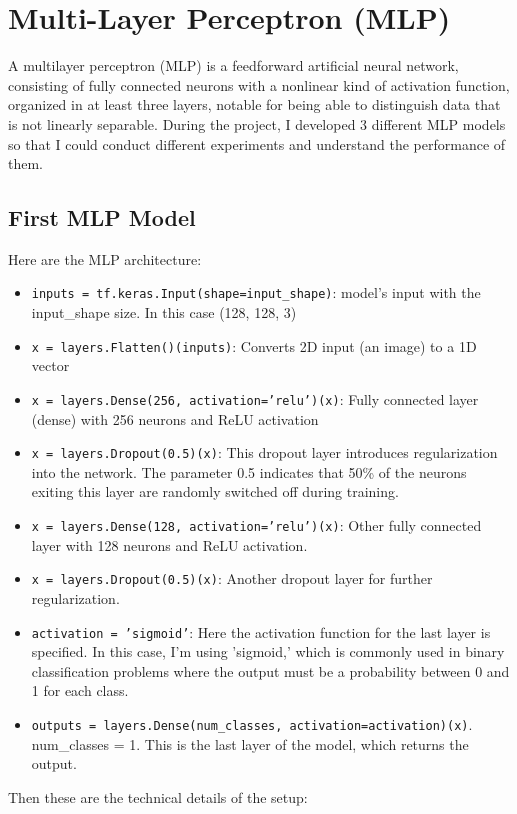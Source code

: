\section{Multi-Layer Perceptron (MLP)}
A multilayer perceptron (MLP) is a feedforward artificial neural network, consisting of fully connected neurons with a nonlinear kind of activation function, organized in at least three layers, notable for being able to distinguish data that is not linearly separable. \cite{mlp}
During the project, I developed 3 different MLP models so that I could conduct different experiments and understand the performance of them.
\subsection{First MLP Model}
Here are the MLP architecture:
\begin{itemize}
\item \texttt{inputs = tf.keras.Input(shape=input\_shape)}: model's input with the input\_shape size. In this case (128, 128, 3)
\item \texttt{x = layers.Flatten()(inputs)}: Converts 2D input (an image) to a 1D vector
\item \texttt{x = layers.Dense(256, activation='relu')(x)}: Fully connected layer (dense) with 256 neurons and ReLU activation
\item \texttt{x = layers.Dropout(0.5)(x)}: This dropout layer introduces regularization into the network. The parameter 0.5 indicates that 50\% of the neurons exiting this layer are randomly switched off during training.
\item \texttt{x = layers.Dense(128, activation='relu')(x)}: Other fully connected layer with 128 neurons and ReLU activation.
\item \texttt{x = layers.Dropout(0.5)(x)}: Another dropout layer for further regularization.
\item \texttt{activation = 'sigmoid'}: Here the activation function for the last layer is specified. In this case, I'm using 'sigmoid,' which is commonly used in binary classification problems where the output must be a probability between 0 and 1 for each class.
\item \texttt{outputs = layers.Dense(num\_classes, activation=activation)(x)}. \\
num\_classes = 1. This is the last layer of the model, which returns the output.
\end{itemize}
Then these are the technical details of the setup:
